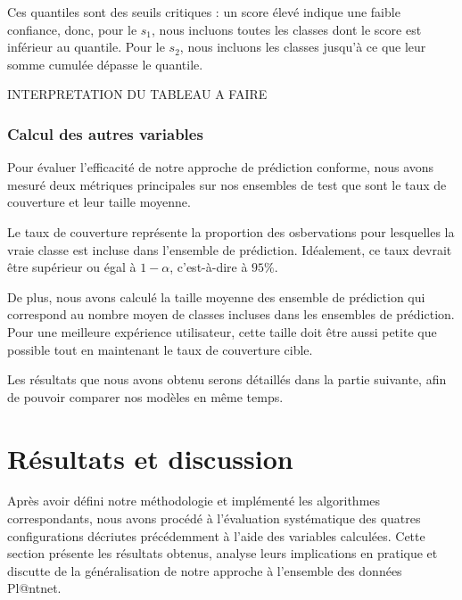 \documentclass[a4paper,12pt]{article}
\begin{document}
\vspace{0.2cm}

Ces quantiles sont des seuils critiques : un score élevé indique une faible confiance, donc, pour le $s_1$, nous incluons toutes les classes dont le score est inférieur au quantile. Pour le $s_2$, nous incluons les classes jusqu'à ce que leur somme cumulée dépasse le quantile.

\vspace{0.2cm}

INTERPRETATION DU TABLEAU A FAIRE

\subsubsection{Calcul des autres variables}

Pour évaluer l'efficacité de notre approche de prédiction conforme, nous avons mesuré deux métriques principales sur nos ensembles de test que sont le taux de couverture et leur taille moyenne. 

\vspace{0.2cm}

Le taux de couverture représente la proportion des osbervations pour lesquelles la vraie classe est incluse dans l'ensemble de prédiction. Idéalement, ce taux devrait être supérieur ou égal à $1- \alpha$, c'est-à-dire à $95\%$.

\vspace{0.2cm}

De plus, nous avons calculé la taille moyenne des ensemble de prédiction qui correspond au nombre moyen de classes incluses dans les ensembles de prédiction. Pour une meilleure expérience utilisateur, cette taille doit être aussi petite que possible tout en maintenant le taux de couverture cible.

\vspace{0.2cm}

Les résultats que nous avons obtenu serons détaillés dans la partie suivante, afin de pouvoir comparer nos modèles en même temps.

\section{Résultats et discussion}

Après avoir défini notre méthodologie et implémenté les algorithmes correspondants, nous avons procédé à l'évaluation systématique des quatres configurations décriutes précédemment à l'aide des variables calculées. Cette section présente les résultats obtenus, analyse leurs implications en pratique et discutte de la généralisation de notre approche à l'ensemble des données Pl@ntnet.
\end{document}
